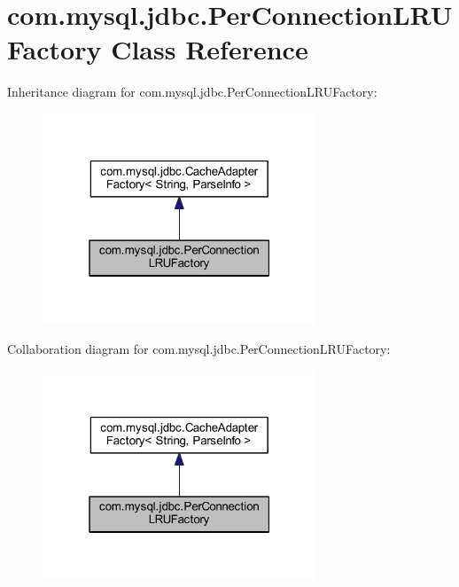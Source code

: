 \hypertarget{classcom_1_1mysql_1_1jdbc_1_1_per_connection_l_r_u_factory}{}\section{com.\+mysql.\+jdbc.\+Per\+Connection\+L\+R\+U\+Factory Class Reference}
\label{classcom_1_1mysql_1_1jdbc_1_1_per_connection_l_r_u_factory}


Inheritance diagram for com.\+mysql.\+jdbc.\+Per\+Connection\+L\+R\+U\+Factory\+:
\nopagebreak
\begin{figure}[H]
\begin{center}
\leavevmode
\includegraphics[width=232pt]{classcom_1_1mysql_1_1jdbc_1_1_per_connection_l_r_u_factory__inherit__graph}
\end{center}
\end{figure}


Collaboration diagram for com.\+mysql.\+jdbc.\+Per\+Connection\+L\+R\+U\+Factory\+:
\nopagebreak
\begin{figure}[H]
\begin{center}
\leavevmode
\includegraphics[width=232pt]{classcom_1_1mysql_1_1jdbc_1_1_per_connection_l_r_u_factory__coll__graph}
\end{center}
\end{figure}
